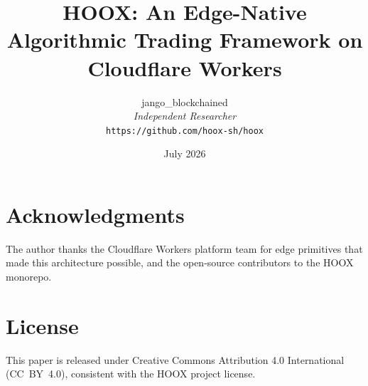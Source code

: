 \documentclass[10pt,a4paper]{article}
\title{\textbf{HOOX: An Edge-Native Algorithmic Trading Framework on Cloudflare Workers}}
\author{
  jango\_blockchained \\
  \small\textit{Independent Researcher} \\
  \small\texttt{https://github.com/hoox-sh/hoox}
}
\date{July 2026}
\begin{document}
\maketitle




















\section*{Acknowledgments}

The author thanks the Cloudflare Workers platform team for edge primitives that made this architecture possible, and the open-source contributors to the \textsc{HOOX} monorepo.

\section*{License}

This paper is released under Creative Commons Attribution 4.0 International (CC~BY~4.0), consistent with the \textsc{HOOX} project license.




\appendix







\end{document}

